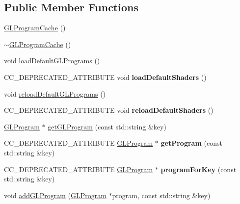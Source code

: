 \subsection*{Public Member Functions}
\begin{DoxyCompactItemize}
\item 
\hyperlink{classGLProgramCache_a6a4da5461d3f7d0dee493a1b7ccf6261}{G\+L\+Program\+Cache} ()
\item 
\hyperlink{classGLProgramCache_a2374ee8aab9567f68aa52ab35301db45}{$\sim$\+G\+L\+Program\+Cache} ()
\item 
void \hyperlink{classGLProgramCache_a4317e3ad0ecbd5696ae3d0006da2cddd}{load\+Default\+G\+L\+Programs} ()
\item 
\mbox{\label{classGLProgramCache_af135905a5c8701d6db4472b4cab247fb}} 
C\+C\+\_\+\+D\+E\+P\+R\+E\+C\+A\+T\+E\+D\+\_\+\+A\+T\+T\+R\+I\+B\+U\+TE void {\bfseries load\+Default\+Shaders} ()
\item 
void \hyperlink{classGLProgramCache_a8405ebabc9102acb46c6f17beae701f6}{reload\+Default\+G\+L\+Programs} ()
\item 
\mbox{\label{classGLProgramCache_aff94e098b35f2f9202d017db1f426efd}} 
C\+C\+\_\+\+D\+E\+P\+R\+E\+C\+A\+T\+E\+D\+\_\+\+A\+T\+T\+R\+I\+B\+U\+TE void {\bfseries reload\+Default\+Shaders} ()
\item 
\hyperlink{classGLProgram}{G\+L\+Program} $\ast$ \hyperlink{classGLProgramCache_ac2eed97e0ec0fffc8583505772cf9f82}{get\+G\+L\+Program} (const std\+::string \&key)
\item 
\mbox{\label{classGLProgramCache_a067162a62910fed78cebf47c0fb54a23}} 
C\+C\+\_\+\+D\+E\+P\+R\+E\+C\+A\+T\+E\+D\+\_\+\+A\+T\+T\+R\+I\+B\+U\+TE \hyperlink{classGLProgram}{G\+L\+Program} $\ast$ {\bfseries get\+Program} (const std\+::string \&key)
\item 
\mbox{\label{classGLProgramCache_a76417ac01e21da7a14a951fb833b4cd8}} 
C\+C\+\_\+\+D\+E\+P\+R\+E\+C\+A\+T\+E\+D\+\_\+\+A\+T\+T\+R\+I\+B\+U\+TE \hyperlink{classGLProgram}{G\+L\+Program} $\ast$ {\bfseries program\+For\+Key} (const std\+::string \&key)
\item 
void \hyperlink{classGLProgramCache_a2a71f5f18bd022f43de7fc55f7e1252a}{add\+G\+L\+Program} (\hyperlink{classGLProgram}{G\+L\+Program} $\ast$program, const std\+::string \&key)

\end{DoxyCompactItemize}
